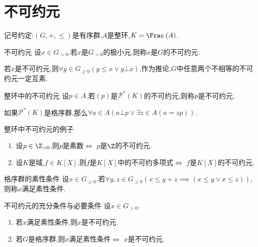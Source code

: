 \section{不可约元}

记号约定:$\left(G,+,\leq\right)$是有序群,$A$是整环,$K=\Frac\left(A\right)$.

\begin{definition}{不可约元}{}
	设$x\in G_{>0}$.若$x$是$G_{>0}$的极小元,则称$x$是$G$的不可约元.
\end{definition}

\begin{remark}{}{}
	若$x$是不可约元,则$\forall y\in G_{\geq 0}\left(y\leq x\vee y\bot x\right)$.作为推论,$G$中任意两个不相等的不可约元一定互素.
\end{remark}

\begin{definition}{整环中的不可约元}{}
	设$p\in A$.若$\left(p\right)$是$\mathcal{P}^{\ast}\left(K\right)$的不可约元,则称$p$是不可约元.
\end{definition}

\begin{remark}{}{}
	如果$\mathcal{P}^{\ast}\left(K\right)$是格序群,那么$\forall a\in A\left(a\bot p\vee\exists z\in A\left(a=zp\right)\right)$.
\end{remark}

\begin{example}{整环中不可约元的例子}{}
	\begin{enumerate}
		\item 设$p\in\Z_{>0}$,则$p$是素数$\iff$ $p$是$\Z$的不可约元.
		\item 设$K$是域,$f\in K[X]$,则$f$是$K[X]$中的不可约多项式$\iff$ $f$是$K[X]$的不可约元.
	\end{enumerate}
\end{example}

\begin{definition}{格序群的素性条件}{}
	设$x\in G_{\geqslant 0}$.若$\forall y,z\in G_{\geqslant 0}\left(x\leqslant y+z\implies\left(x\leqslant y\vee x\leqslant z\right)\right)$,则称$x$满足素性条件.
\end{definition}

\begin{proposition}{不可约元的充分条件与必要条件}{}
	设$x\in G_{>0}$.
	\begin{enumerate}
		\item 若$x$满足素性条件,则$x$是不可约元.
		\item 若$G$是格序群,则$x$满足素性条件$\iff$ $x$是不可约元.
	\end{enumerate}
\end{proposition}

